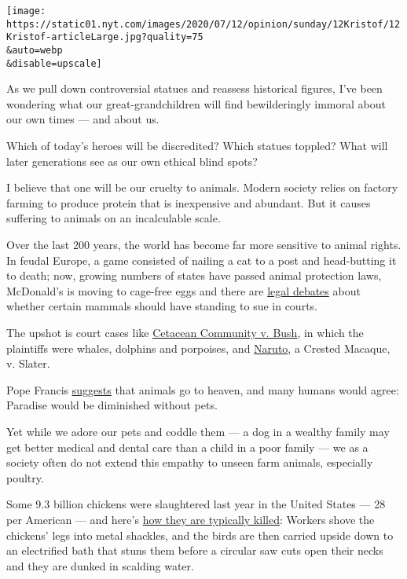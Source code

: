 \texttt{[image: https://static01.nyt.com/images/2020/07/12/opinion/sunday/12Kristof/12Kristof-articleLarge.jpg?quality=75\\\&auto=webp\\\&disable=upscale]}

As we pull down controversial statues and reassess historical figures,
I've been wondering what our great-grandchildren will find bewilderingly
immoral about our own times --- and about us.

Which of today's heroes will be discredited? Which statues toppled? What
will later generations see as our own ethical blind spots?

I believe that one will be our cruelty to animals. Modern society relies
on factory farming to produce protein that is inexpensive and abundant.
But it causes suffering to animals on an incalculable scale.

Over the last 200 years, the world has become far more sensitive to
animal rights. In feudal Europe, a game consisted of nailing a cat to a
post and head-butting it to death; now, growing numbers of states have
passed animal protection laws, McDonald's is moving to cage-free eggs
and there are
\href{https://fedsoc.org/commentary/fedsoc-blog/do-animals-or-humans-claiming-to-represent-them-have-constitutional-standing-to-file-federal-lawsuits-in-the-ninth-circuit-the-answer-is-yes\#:~:text=In\%20the\%20Ninth\%20Circuit\%2C\%20the\%20Answer\%20Is\%20Yes.,-Topics\%3A\&text=You\%20might\%20be\%20a\%20little,file\%20lawsuits\%20in\%20federal\%20cases.}{legal
debates} about whether certain mammals should have standing to sue in
courts.

The upshot is court cases like
\href{https://www.animallaw.info/case/cetacean-community-v-bush}{Cetacean
Community v. Bush}, in which the plaintiffs were whales, dolphins and
porpoises, and
\href{https://www.animallaw.info/pleading/naruto-v-slater-peta}{Naruto},
a Crested Macaque, v. Slater.

Pope Francis
\href{https://www.nytimes.com/2015/09/24/opinion/nicholas-kristof-a-pope-for-all-species.html}{suggests}
that animals go to heaven, and many humans would agree: Paradise would
be diminished without pets.

Yet while we adore our pets and coddle them --- a dog in a wealthy
family may get better medical and dental care than a child in a poor
family --- we as a society often do not extend this empathy to unseen
farm animals, especially poultry.

Some 9.3 billion chickens were slaughtered last year in the United
States --- 28 per American --- and here's
\href{https://www.nytimes.com/2015/03/15/opinion/sunday/nicholas-kristof-to-kill-a-chicken.html}{how
they are typically killed}: Workers shove the chickens' legs into metal
shackles, and the birds are then carried upside down to an electrified
bath that stuns them before a circular saw cuts open their necks and
they are dunked in scalding water.

